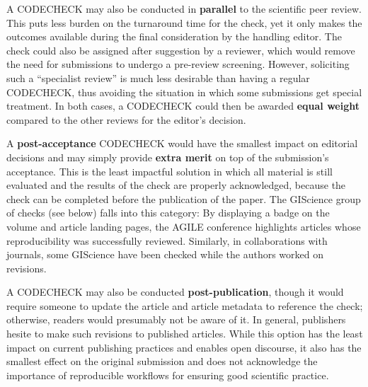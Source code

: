 \documentclass[12pt]{article}
\begin{document}
A CODECHECK may also be conducted in \textbf{parallel} to the scientific peer review.
This puts less burden on the turnaround time for the check, yet it only makes the outcomes available during the final consideration by the handling editor.
The check could also be assigned after suggestion by a reviewer, which would remove the need for submissions to undergo a pre-review screening.
However, soliciting such a ``specialist review'' is much less desirable than having a regular CODECHECK, thus avoiding the situation in which some submissions get special treatment.
In both cases, a CODECHECK could then be awarded \textbf{equal weight} compared to the other reviews for the editor's decision.

A \textbf{post-acceptance} CODECHECK would have the smallest impact on editorial decisions and may simply provide \textbf{extra merit} on top of the submission's acceptance.
This is the least impactful solution in which all material is still evaluated and the results of the check are properly acknowledged, because the check can be completed before the publication of the paper.
The GIScience group of checks (see below) falls into this category:
By displaying a badge on the volume and article landing pages, the AGILE conference highlights articles whose reproducibility was successfully reviewed.
Similarly, in collaborations with journals, some GIScience have been checked while the authors worked on revisions.

A CODECHECK may also be conducted \textbf{post-publication}, though it would require someone to update the article and article metadata to reference the check; otherwise, readers would presumably not be aware of it.
In general, publishers hesite to make such revisions to published articles.
While this option has the least impact on current publishing practices and enables open discourse, it also has the smallest effect on the original submission and does not acknowledge the importance of reproducible workflows for ensuring good scientific practice.
\end{document}
